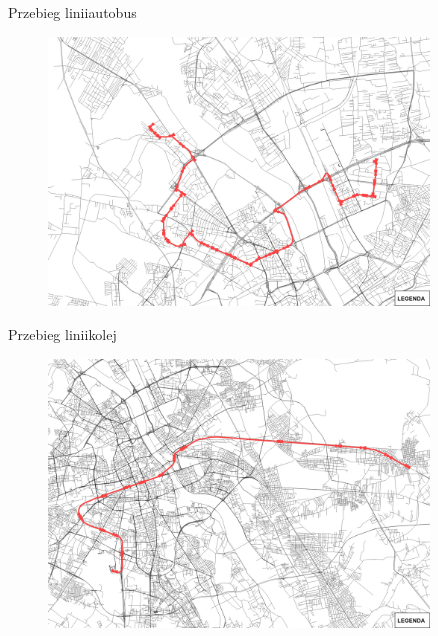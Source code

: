 \documentclass[8pt]{beamer}
\begin{document}
\begin{frame}{Przebieg linii}{autobus}
\begin{figure}\begin{center}
\includegraphics[width=0.9\textwidth]{line}
 \end{center}  \end{figure} 
\end{frame}

\begin{frame}{Przebieg linii}{kolej}
\begin{figure}\begin{center}
\includegraphics[width=0.9\textwidth]{line2}
 \end{center}  \end{figure} 
\end{frame}
\end{document}

